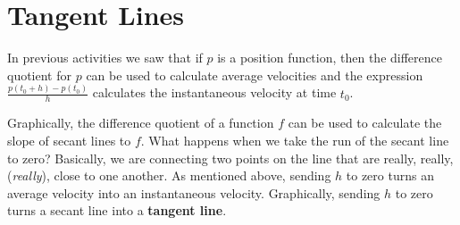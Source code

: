 \documentclass[12pt,]{book}
\newcommand{\terminology}[1]{\textbf{#1}}
\theoremstyle{plain}
\theoremstyle{definition}
\numberwithin{equation}{section}
\newcommand{\fe}[2]{#1\mathopen{}\left(#2\right)\mathclose{}}
\begin{document}
\section[Tangent Lines]{Tangent Lines}\label{section-tangent-lines}
In previous activities we saw that if \(p\) is a position function, then the difference quotient for \(p\) can be used to calculate average velocities and the expression \(\frac{\fe{p}{t_0+h}-\fe{p}{t_0}}{h}\) calculates the instantaneous velocity at time \(t_0\).%
\par
Graphically, the difference quotient of a function \(f\) can be used to calculate the slope of secant lines to \(f\). What happens when we take the run of the secant line to zero? Basically, we are connecting two points on the line that are really, really, (\emph{really}), close to one another. As mentioned above, sending \(h\) to zero turns an average velocity into an instantaneous velocity. Graphically, sending \(h\) to zero turns a secant line into a \terminology{tangent line}.%
\end{document}

